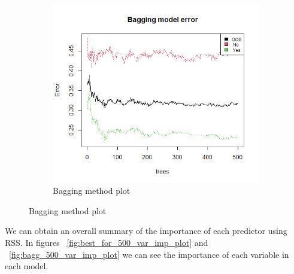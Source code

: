 \begin{figure}[H]
\begin{subfigure}{.3\textwidth}
		\includegraphics[width=\linewidth]{ImageFiles/Classification/bagg_500_plot}
		\caption{Bagging method plot}
		\label{fig:bagg_500_plot}
	\end{subfigure}
\end{figure}

We can obtain an overall summary of the importance of each predictor using RSS.
In figures \Fig~\ref{fig:best_for_500_var_imp_plot} and \Fig~\ref{fig:bagg_500_var_imp_plot} we can see the importance of each variable in each model.

